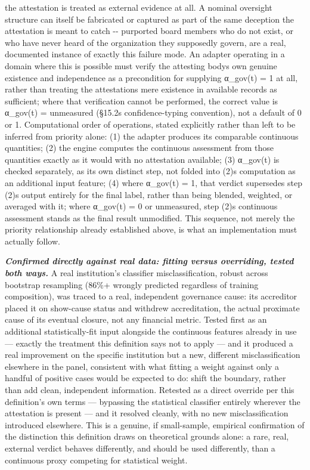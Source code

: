 \documentclass[
]{article}
\begin{document}
the attestation is treated as external evidence at all. A nominal
oversight structure can itself be fabricated or captured as part of the
same deception the attestation is meant to catch -\/- purported board
members who do not exist, or who have never heard of the organization
they supposedly govern, are a real, documented instance of exactly this
failure mode. An adapter operating in a domain where this is possible
must verify the attesting body\textquotesingle s own genuine existence
and independence as a precondition for supplying α\_gov(t) = 1 at all,
rather than treating the attestation\textquotesingle s mere existence in
available records as sufficient; where that verification cannot be
performed, the correct value is α\_gov(t) = unmeasured
(§15.2\textquotesingle s confidence-typing convention), not a default of
0 or 1. Computational order of operations, stated explicitly rather than
left to be inferred from priority alone: (1) the adapter produces its
comparable continuous quantities; (2) the engine computes the continuous
assessment from those quantities exactly as it would with no attestation
available; (3) α\_gov(t) is checked separately, as its own distinct
step, not folded into (2)\textquotesingle s computation as an additional
input feature; (4) where α\_gov(t) = 1, that verdict supersedes step
(2)\textquotesingle s output entirely for the final label, rather than
being blended, weighted, or averaged with it; where α\_gov(t) = 0 or
unmeasured, step (2)\textquotesingle s continuous assessment stands as
the final result unmodified. This sequence, not merely the priority
relationship already established above, is what an implementation must
actually follow.

\emph{\textbf{Confirmed directly against real data: fitting versus
overriding, tested both ways.}} A real institution's classifier
misclassification, robust across bootstrap resampling (86\%+ wrongly
predicted regardless of training composition), was traced to a real,
independent governance cause: its accreditor placed it on show-cause
status and withdrew accreditation, the actual proximate cause of its
eventual closure, not any financial metric. Tested first as an
additional statistically-fit input alongside the continuous features
already in use --- exactly the treatment this definition says not to
apply --- and it produced a real improvement on the specific institution
but a new, different misclassification elsewhere in the panel,
consistent with what fitting a weight against only a handful of positive
cases would be expected to do: shift the boundary, rather than add
clean, independent information. Retested as a direct override per this
definition's own terms --- bypassing the statistical classifier entirely
wherever the attestation is present --- and it resolved cleanly, with no
new misclassification introduced elsewhere. This is a genuine, if
small-sample, empirical confirmation of the distinction this definition
draws on theoretical grounds alone: a rare, real, external verdict
behaves differently, and should be used differently, than a continuous
proxy competing for statistical weight.
\end{document}
